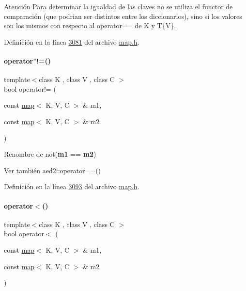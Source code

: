 \begin{DoxyAttention}{Atención}
Para determinar la igualdad de las claves no se utiliza el functor de comparación (que podrian ser distintos entre los diccionarios), sino si los valores son los mismos con respecto al operator== de K y T\{V\}. 
\end{DoxyAttention}


Definición en la línea \hyperlink{map_8h_source_l03081}{3081} del archivo \hyperlink{map_8h_source}{map.\+h}.

\mbox{\label{classaed2_1_1map_abce0fa35c5b25fd67111c2e704616f09_abce0fa35c5b25fd67111c2e704616f09}} 
\paragraph{\texorpdfstring{operator"!=()}{operator!=()}}
{\footnotesize\ttfamily template$<$class K , class V , class C $>$ \\
bool operator!= (\begin{DoxyParamCaption}\item[{const \hyperlink{classaed2_1_1map}{map}$<$ K, V, C $>$ \&}]{m1,  }\item[{const \hyperlink{classaed2_1_1map}{map}$<$ K, V, C $>$ \&}]{m2 }\end{DoxyParamCaption})\hspace{0.3cm}{\ttfamily [related]}}



Renombre de not({\bfseries m1} == {\bfseries m2}) 

\begin{DoxySeeAlso}{Ver también}
aed2\+::operator==() 
\end{DoxySeeAlso}


Definición en la línea \hyperlink{map_8h_source_l03093}{3093} del archivo \hyperlink{map_8h_source}{map.\+h}.

\mbox{\label{classaed2_1_1map_a8ff07f6a24c290ea7e8f63ec7ab24f8d_a8ff07f6a24c290ea7e8f63ec7ab24f8d}} 
\paragraph{\texorpdfstring{operator$<$()}{operator<()}}
{\footnotesize\ttfamily template$<$class K , class V , class C $>$ \\
bool operator$<$ (\begin{DoxyParamCaption}\item[{const \hyperlink{classaed2_1_1map}{map}$<$ K, V, C $>$ \&}]{m1,  }\item[{const \hyperlink{classaed2_1_1map}{map}$<$ K, V, C $>$ \&}]{m2 }\end{DoxyParamCaption})\hspace{0.3cm}{\ttfamily [related]}}



